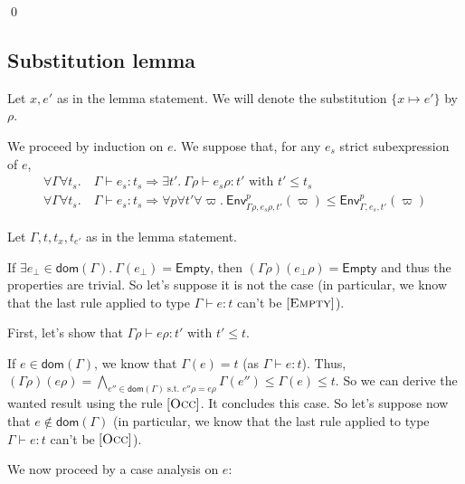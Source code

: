 \documentclass[a4paper]{article}%
\newcommand{\dom}[1]{\textsf{dom}(#1)}
\newcommand{\Empty} {\textsf{Empty}}%
\newcommand{\subst}[2]{\{#1 \mapsto #2\}}
\newcommand{\Gp}[2]{\textsf{Env}^{#1}_{#2}}
\theoremstyle{definition}
\newcommand {\Rule}[1] {[\textsc{#1}]}
\begin{document}
    \qed

    \subsection{Substitution lemma}

    Let $x,e'$ as in the lemma statement. We will denote the substitution $\subst x {e'}$ by $\rho$.

    We proceed by induction on $e$. We suppose that, for any $e_s$ strict subexpression of $e$,
    \begin{align*}
      \forall \Gamma \forall t_s.\ &\Gamma \vdash e_s:t_s \Rightarrow \exists t'.\ \Gamma \rho \vdash e_s \rho:t' \text{ with } t'\leq t_s\\
      \forall \Gamma \forall t_s.\ &\Gamma \vdash e_s:t_s \Rightarrow \forall p \forall t' \forall \varpi.\ \Gp p {\Gamma\rho,e_s\rho,t'} (\varpi) \leq \Gp p {\Gamma,e_s,t'} (\varpi)
    \end{align*}

    Let $\Gamma,t,t_x,t_{e'}$ as in the lemma statement.

    If $\exists e_\bot \in \dom {\Gamma}.\ \Gamma(e_\bot) = \Empty$, then $(\Gamma\rho)(e_\bot\rho) = \Empty$ and thus the properties are trivial.
    So let's suppose it is not the case (in particular, we know that the last rule applied to type $\Gamma \vdash e:t$ can't be $\Rule{Empty}$).

    First, let's show that $\Gamma \rho \vdash e \rho:t'$ with $t'\leq t$.

    If $e\in\dom\Gamma$, we know that $\Gamma(e)=t$ (as $\Gamma \vdash e:t$). Thus, $(\Gamma\rho)(e\rho)=\bigwedge_{e'' \in \dom \Gamma \text{ s.t. } e''\rho=e\rho} \Gamma(e'') \leq \Gamma(e) \leq t$.
    So we can derive the wanted result using the rule $\Rule {Occ}$. It concludes this case. So let's suppose now that $e\not\in\dom\Gamma$ (in particular, we know that the last rule applied to type $\Gamma \vdash e:t$ can't be $\Rule{Occ}$).
    
    We now proceed by a case analysis on $e$:
    
\end{document}
